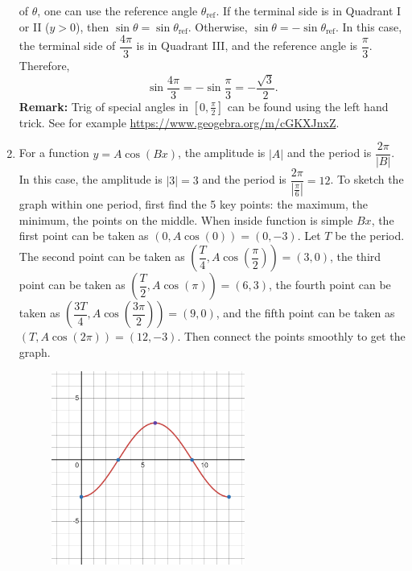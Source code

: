 \documentclass[
  12pt]{article}
\begin{document}
\begin{enumerate}
  of \(\theta\), one can use the reference angle
  \(\theta_{\text{ref}}\). If the terminal side is in Quadrant I or II
  (\(y>0\)), then \(\sin\theta =\sin \theta_{\text{ref}}\). Otherwise,
  \(\sin\theta = -\sin \theta_{\text{ref}}\). In this case, the terminal
  side of \(\dfrac{4\pi}{3}\) is in Quadrant III, and the reference
  angle is \(\dfrac{\pi}{3}\). Therefore,
  \[\sin \dfrac{4\pi}{3} = -\sin \dfrac{\pi}{3} = -\frac{\sqrt{3}}{2}.\]
  \textbf{Remark:} Trig of special angles in \([0, \frac{\pi}{2}]\) can
  be found using the left hand trick. See for example
  \url{https://www.geogebra.org/m/cGKXJnxZ}.
\item
  For a function \(y= A\cos(Bx)\), the amplitude is \(|A|\) and the
  period is \(\dfrac{2\pi}{|B|}\). In this case, the amplitude is
  \(|3|=3\) and the period is \(\dfrac{2\pi}{|\frac{\pi}{6}|}=12\). To
  sketch the graph within one period, first find the 5 key points: the
  maximum, the minimum, the points on the middle. When inside function
  is simple \(Bx\), the first point can be taken as
  \((0, A\cos(0))=(0, -3)\). Let \(T\) be the period. The second point
  can be taken as
  \(\left(\dfrac{T}{4}, A\cos(\dfrac{\pi}{2})\right)=(3, 0)\), the third
  point can be taken as
  \(\left(\dfrac{T}{2}, A\cos(\pi)\right)=(6, 3)\), the fourth point can
  be taken as
  \(\left(\dfrac{3T}{4}, A\cos(\dfrac{3\pi}{2})\right)=(9, 0)\), and the
  fifth point can be taken as \(\left(T, A\cos(2\pi)\right)=(12, -3)\).
  Then connect the points smoothly to get the graph.

  \begin{figure}[H]

  {\centering \includegraphics[width=0.6\textwidth,height=\textheight]{Q11.png}

  }


\end{figure}
\end{enumerate}
\end{document}
